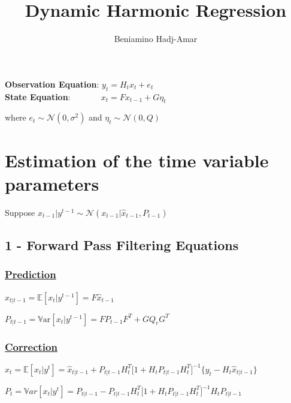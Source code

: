 \documentclass{article}\usepackage[]{graphicx}\usepackage[]{color}
\title{\textbf{Dynamic Harmonic Regression}}
\author{Beniamino Hadj-Amar}
\begin{document}
\maketitle

\renewenvironment{knitrout}{\vspace{1em}}{\vspace{1em}}



\begin{tcolorbox}

\textbf{Observation Equation}: $ y_t = H_t x_t + e_t $
\\\textbf{State Equation}: $ \qquad \quad \, \,   x_t = F x_{t-1} + G \eta_t $

\end{tcolorbox}

where $e_t \sim \mathcal{N}(0, \sigma^2)$ and $\eta_t \sim \mathcal{N}(0, Q)$

\section*{Estimation of the time variable parameters}

Suppose $x_{t-1}| y^{t-1} \sim \mathcal{N}(x_{t-1} | \hat{x}_{t-1}, P_{t-1}) $

\subsection*{1 - Forward Pass Filtering Equations}
\subsubsection*{\underline{Prediction}}

$ \hat{x}_{t|t-1} = \mathbb{E} [ x_t | y^{t-1} ] =  F \hat{x}_{t-1} $

$ P_{t| t-1} = \mathbb{V}\text{ar}[x_t | y^{t-1} ] = F P_{t-1} F^T + G Q_r G^T $

\subsubsection*{\underline{Correction}}

$ \hat{x}_t = \mathbb{E} [x_t | y^t] = \hat{x}_{t|t-1} + P_{t| t-1} H_t^T \Big[ 1 + H_t P_{t| t-1} H_t^T \Big]^{-1}  \{ y_t - H_t \hat{x}_{t|t-1}  \} $

$ P_t = \mathbb{V}ar [x_t | y^t] = P_{t | t-1} - P_{t | t-1} H_t^T \Big[ 1 + H_t P_{t| t-1} H_t^T \Big]^{-1} H_t P_{t | t-1} $
\end{document}

